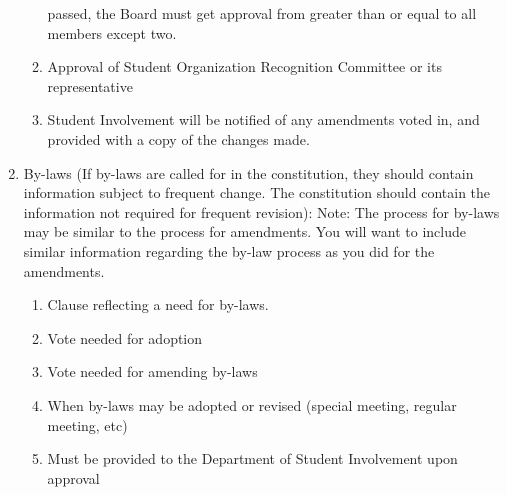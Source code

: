 \begin{enumerate}
\begin{enumerate}
      passed, the Board must get approval from greater than or equal to all
      members except two.
      \item	Approval of Student Organization Recognition Committee or its
      representative
      \item	Student Involvement will be notified of any amendments voted in, and
      provided with a copy of the changes made.
    \end{enumerate}
  \item	By-laws (If by-laws are called for in the constitution, they should
contain information subject to frequent change.  The constitution should contain
the information not required for frequent revision): Note:  The process for
by-laws may be similar to the process for amendments.  You will want to include
similar information regarding the by-law process as you did for the amendments.
    \begin{enumerate}
      \item	Clause reflecting a need for by-laws.
      \item	Vote needed for adoption
      \item	Vote needed for amending by-laws
      \item	When by-laws may be adopted or revised (special meeting, regular
      meeting, etc)
      \item	Must be provided to the Department of Student Involvement upon
      approval
    \end{enumerate}
\end{enumerate}

